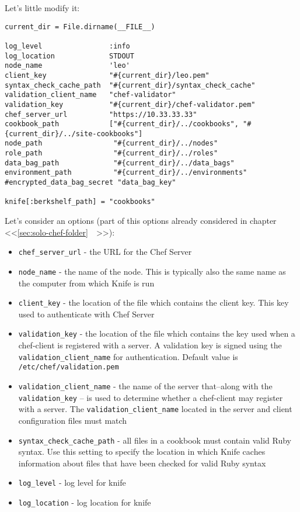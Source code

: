 Let's little modify it:

\begin{lstlisting}[label=lst:my-server-cloud-knife4,title=my-server-cloud/.chef/knife.rb]
current_dir = File.dirname(__FILE__)

log_level                :info
log_location             STDOUT
node_name                'leo'
client_key               "#{current_dir}/leo.pem"
syntax_check_cache_path  "#{current_dir}/syntax_check_cache"
validation_client_name   "chef-validator"
validation_key           "#{current_dir}/chef-validator.pem"
chef_server_url          "https://10.33.33.33"
cookbook_path            ["#{current_dir}/../cookbooks", "#{current_dir}/../site-cookbooks"]
node_path                 "#{current_dir}/../nodes"
role_path                 "#{current_dir}/../roles"
data_bag_path             "#{current_dir}/../data_bags"
environment_path          "#{current_dir}/../environments"
#encrypted_data_bag_secret "data_bag_key"

knife[:berkshelf_path] = "cookbooks"
\end{lstlisting}

Let's consider an options (part of this options already considered in chapter <<\ref{sec:solo-chef-folder}~~>>):

\begin{itemize}
  \item \lstinline!chef_server_url! - the URL for the Chef Server
  \item \lstinline!node_name! - the name of the node. This is typically also the same name as the computer from which Knife is run
  \item \lstinline!client_key! - the location of the file which contains the client key. This key used to authenticate with Chef Server
  \item \lstinline!validation_key! - the location of the file which contains the key used when a chef-client is registered with a server. A validation key is signed using the \lstinline!validation_client_name! for authentication. Default value is \lstinline!/etc/chef/validation.pem!
  \item \lstinline!validation_client_name! - the name of the server that–along with the \lstinline!validation_key! – is used to determine whether a chef-client may register with a server. The \lstinline!validation_client_name! located in the server and client configuration files must match
  \item \lstinline!syntax_check_cache_path! - all files in a cookbook must contain valid Ruby syntax. Use this setting to specify the location in which Knife caches information about files that have been checked for valid Ruby syntax
  \item \lstinline!log_level! - log level for knife
  \item \lstinline!log_location! - log location for knife
\end{itemize}


